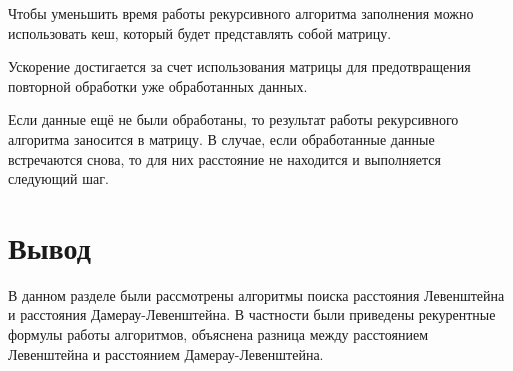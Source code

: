 Чтобы уменьшить время работы рекурсивного алгоритма заполнения можно использовать кеш, который будет представлять собой матрицу.

Ускорение достигается за счет использования матрицы для предотвращения повторной обработки уже обработанных данных.

Если данные ещё не были обработаны, то результат работы рекурсивного алгоритма заносится в матрицу. 
В случае, если обработанные данные встречаются снова, то для них расстояние не находится и выполняется следующий шаг.


\section{Вывод}
В данном разделе были рассмотрены алгоритмы поиска расстояния Левенштейна и расстояния Дамерау-Левенштейна. В частности были приведены рекурентные формулы работы алгоритмов, объяснена разница между расстоянием Левенштейна и расстоянием Дамерау-Левенштейна.
